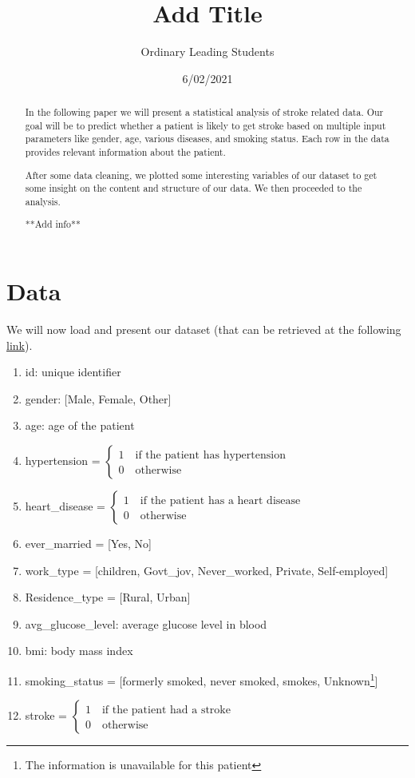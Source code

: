 \documentclass[
]{article}
\title{Add Title}
\author{Ordinary Leading Students}
\date{6/02/2021}
\begin{document}
\maketitle

\begin{abstract}
In the following paper we will present a statistical analysis of stroke related data. Our goal will be to predict whether a patient is likely to get stroke based on multiple input parameters like gender, age, various diseases, and smoking status.
Each row in the data provides relevant information about the patient.

After some data cleaning, we plotted some interesting variables of our dataset to get some insight on
the content and structure of our data.
We then proceeded to the analysis. 


**Add info**
\end{abstract}

\section{Data}

We will now load and present our dataset (that can be retrieved at the
following
\href{https://www.kaggle.com/fedesoriano/stroke-prediction-dataset}{link}).\\

\begin{enumerate}
\item id: unique identifier
\item gender: [Male, Female, Other]
\item age: age of the patient
\item hypertension = $\begin{cases} 1 \quad \text{if the patient has hypertension}\\  0 \quad \text{otherwise} \end{cases}$
\item heart\_disease = $\begin{cases} 1 \quad \text{if the patient has a heart disease}\\  0 \quad \text{otherwise} \end{cases}$
\item ever\_married = [Yes, No]
\item work\_type = [children, Govt\_jov, Never\_worked, Private, Self-employed]
\item Residence\_type = [Rural, Urban]
\item avg\_glucose\_level: average glucose level in blood
\item bmi: body mass index
\item smoking\_status = [formerly smoked, never smoked, smokes, Unknown\footnote{The information is unavailable for this patient}]
\item stroke = $\begin{cases} 1 \quad \text{if the patient had a stroke}\\  0 \quad \text{otherwise} \end{cases}$
\end{enumerate}
\end{document}
